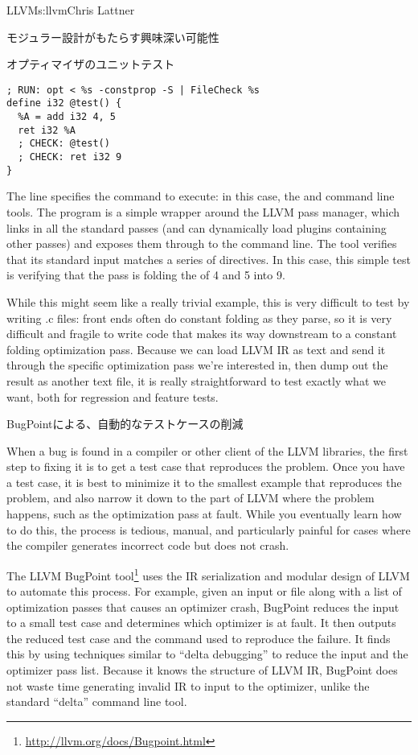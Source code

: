 \begin{aosachapter}{LLVM}{s:llvm}{Chris Lattner}
\begin{aosasect1}{モジュラー設計がもたらす興味深い可能性}
\begin{aosasect2}{オプティマイザのユニットテスト}
\begin{verbatim}
; RUN: opt < %s -constprop -S | FileCheck %s
define i32 @test() {
  %A = add i32 4, 5
  ret i32 %A
  ; CHECK: @test()
  ; CHECK: ret i32 9
}
\end{verbatim}

\noindent The  line specifies the command to execute: in this case,
the  and  command line tools.  The
 program is a simple wrapper around the LLVM pass manager,
which links in all the standard passes (and can dynamically load
plugins containing other passes) and exposes them through to the
command line.  The  tool verifies that its standard
input matches a series of  directives.  In this case, this
simple test is verifying that the  pass is folding the
 of 4 and 5 into 9.

While this might seem like a really trivial example, this is very
difficult to test by writing .c files: front ends often do constant
folding as they parse, so it is very difficult and fragile to write
code that makes its way downstream to a constant folding optimization
pass.  Because we can load LLVM IR as text and send it through the
specific optimization pass we're interested in, then dump out the
result as another text file, it is really straightforward to test
exactly what we want, both for regression and feature tests.

\end{aosasect2}

\begin{aosasect2}{BugPointによる、自動的なテストケースの削減}

When a bug is found in a compiler or other client of the LLVM
libraries, the first step to fixing it is to get a test case that
reproduces the problem.  Once you have a test case, it is best to
minimize it to the smallest example that reproduces the problem, and
also narrow it down to the part of LLVM where the problem happens,
such as the optimization pass at fault.  While you eventually learn
how to do this, the process is tedious, manual, and particularly
painful for cases where the compiler generates incorrect code but does
not crash.

The LLVM BugPoint
tool\footnote{\url{http://llvm.org/docs/Bugpoint.html}} uses the IR
serialization and modular design of LLVM to automate this process.
For example, given an input  or  file along with a
list of optimization passes that causes an optimizer crash, BugPoint
reduces the input to a small test case and determines which optimizer
is at fault.  It then outputs the reduced test case and the 
command used to reproduce the failure.  It finds this by using
techniques similar to ``delta debugging'' to reduce the input and the
optimizer pass list.  Because it knows the structure of LLVM IR,
BugPoint does not waste time generating invalid IR to input to the
optimizer, unlike the standard ``delta'' command line tool.


\end{aosasect2}
\end{aosasect1}
\end{aosachapter}
